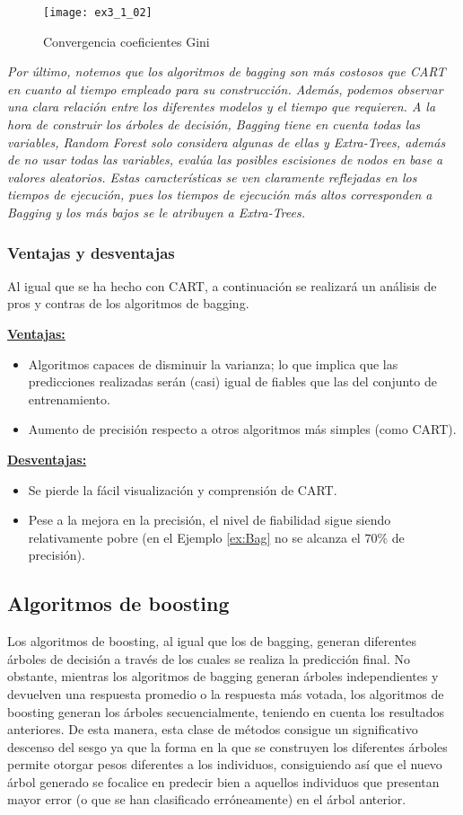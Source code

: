 \documentclass[12pt,twoside]{article}
\begin{document}
\begin{figure}[h]
\centering
\texttt{[image: ex3\_1\_02]}
\caption{Convergencia coeficientes Gini}
\end{figure}

\emph{Por último, notemos que los algoritmos de bagging son más costosos que CART en cuanto al tiempo empleado para su construcción. Además, podemos observar una clara relación entre los diferentes modelos y el tiempo que requieren. A la hora de construir los árboles de decisión, Bagging tiene en cuenta todas las variables, Random Forest solo considera algunas de ellas y Extra-Trees, además de no usar todas las variables, evalúa las posibles escisiones de nodos en base a valores aleatorios. Estas características se ven claramente reflejadas en los tiempos de ejecución, pues los tiempos de ejecución más altos corresponden a Bagging y los más bajos se le atribuyen a Extra-Trees.}


\subsubsection{Ventajas y desventajas}
Al igual que se ha hecho con CART, a continuación se realizará un análisis de pros y contras de los algoritmos de bagging.

\textbf{\underline{Ventajas:}}
\begin{itemize}
\item  Algoritmos capaces de disminuir la varianza; lo que implica que las predicciones realizadas serán (casi) igual de fiables que las del conjunto de entrenamiento.
\item Aumento de precisión respecto a otros algoritmos más simples (como CART).
\end{itemize}

\textbf{\underline{Desventajas:}}
\begin{itemize}
\item Se pierde la fácil visualización y comprensión de CART.
\item Pese a la mejora en la precisión, el nivel de fiabilidad sigue siendo relativamente pobre (en el Ejemplo \ref{ex:Bag} no se alcanza el $70 \%$ de precisión).
\end{itemize}



\subsection{Algoritmos de boosting}
Los algoritmos de boosting, al igual que los de bagging, generan diferentes árboles de decisión a través de los cuales se realiza la predicción final. No obstante, mientras los algoritmos de bagging generan árboles independientes y devuelven una respuesta promedio o la respuesta más votada, los algoritmos de boosting generan los árboles secuencialmente, teniendo en cuenta los resultados anteriores. De esta manera, esta clase de métodos consigue un significativo descenso del sesgo ya que la forma en la que se construyen los diferentes árboles permite otorgar pesos diferentes a los individuos, consiguiendo así que el nuevo árbol generado se focalice en predecir bien a aquellos individuos que presentan mayor error (o que se han clasificado erróneamente) en el árbol anterior.
\end{document}

